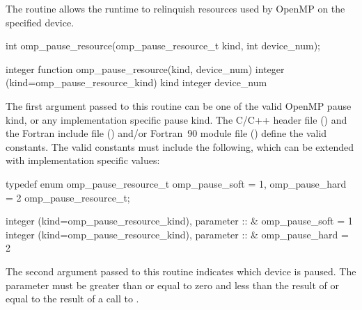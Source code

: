The  routine allows the runtime to 
relinquish resources used by OpenMP on the specified device.

\begin{samepage}
\format
\begin{ccppspecific}
\begin{ompcFunction}
int omp_pause_resource(omp_pause_resource_t kind, int device_num);
\end{ompcFunction}
\end{ccppspecific}
\end{samepage}

\begin{fortranspecific}
\begin{ompfFunction}
integer function omp_pause_resource(kind, device_num)
integer (kind=omp_pause_resource_kind) kind
integer device_num
\end{ompfFunction}
\end{fortranspecific}

\constraints

The first argument passed to this routine can be one of the valid OpenMP pause kind, 
or any implementation specific pause kind. The C/C++ header file
() and the Fortran include file () and/or Fortran~90 module file
() define the valid constants. 
The valid constants must include the following, which can be extended with implementation 
specific values:

\begin{samepage}
\format
\begin{ccppspecific}
\begin{ompcFunction}
typedef enum omp_pause_resource_t {
  omp_pause_soft = 1,
  omp_pause_hard = 2
} omp_pause_resource_t;
\end{ompcFunction}
\end{ccppspecific}
\end{samepage}

\begin{fortranspecific}
\begin{ompfFunction}
integer (kind=omp_pause_resource_kind), parameter :: &
  omp_pause_soft = 1
integer (kind=omp_pause_resource_kind), parameter :: &
  omp_pause_hard = 2
\end{ompfFunction}
\end{fortranspecific}

The second argument passed to this routine indicates which device is paused. The  parameter
must be greater than or equal to zero and less than the result of 
or equal to the result of a call to .

